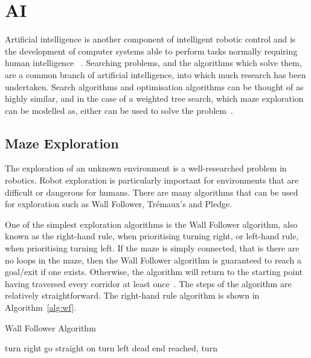 \section{AI}\label{litreview/maze}
Artificial intelligence is another component of intelligent robotic control and is the
development of computer systems able to perform tasks normally requiring human intelligence~
\cite{russell2016artificial}. Searching problems, and the algorithms which solve them, are a
common branch of artificial intelligence, into which much research has been undertaken. Search
algorithms and optimisation algorithms can be thought of as highly similar, and in the case of
a weighted tree search, which maze exploration can be modelled as, either can be used to solve the problem~\cite{kanal2012search}.

\subsection{Maze Exploration}\label{litreview/maze/exploration}
The exploration of an unknown environment is a well-researched problem in
robotics. Robot exploration is particularly important for
environments that are difficult or dangerous for humans. There are many
algorithms that can be used for exploration such as Wall Follower,
Trémaux's and Pledge.

One of the simplest exploration algorithms is the Wall Follower algorithm,
also known as the right-hand rule, when prioritising turning right, or
left-hand rule, when prioritising turning left. If the maze is simply
connected, that is there are no loops in the maze, then the Wall Follower
algorithm is guaranteed to reach a goal/exit if one exists. Otherwise, the
algorithm will return to the starting point having traversed every corridor at
least once~\cite{wallFollowerArcBotics}. The steps of the algorithm are
relatively straightforward. The right-hand rule algorithm is shown in Algorithm~\ref{alg:wf}.

\begin{algorithm}
\caption{Wall Follower Algorithm}\label{alg:wf}
\begin{algorithmic}
\REPEAT
{}
  \STATE turn right
  \STATE go straight on
  \STATE turn left
\ELSE
  \STATE dead end reached, turn
\ENDIF
{}

\end{algorithmic}
\end{algorithm}

